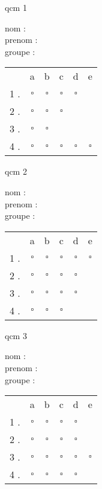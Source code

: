 \documentclass[a4paper]{article}
\begin{document}
	\begin{center}
		qcm 1
	\end{center}
	nom :\\
	prenom :\\
	groupe :
	\begin{center}
		\begin{tabular}{*{6}{c}}
			&a&b&c&d&e\\
			1 . &$\square$&$\square$&$\square$&$\square$\\
			2 . &$\square$&$\square$&$\square$\\
			3 . &$\square$&$\square$\\
			4 . &$\square$&$\square$&$\square$&$\square$&$\square$\\
		\end{tabular}
	\end{center}
	\newpage
	\begin{center}
		qcm 2
	\end{center}
	nom :\\
	prenom :\\
	groupe :
	\begin{center}
		\begin{tabular}{*{6}{c}}
			&a&b&c&d&e\\
			1 . &$\square$&$\square$&$\square$&$\square$&$\square$\\
			2 . &$\square$&$\square$&$\square$&$\square$\\
			3 . &$\square$&$\square$&$\square$&$\square$\\
			4 . &$\square$&$\square$&$\square$\\
		\end{tabular}
	\end{center}
	\newpage
	\begin{center}
		qcm 3
	\end{center}
	nom :\\
	prenom :\\
	groupe :
	\begin{center}
		\begin{tabular}{*{6}{c}}
			&a&b&c&d&e\\
			1 . &$\square$&$\square$&$\square$&$\square$\\
			2 . &$\square$&$\square$&$\square$&$\square$\\
			3 . &$\square$&$\square$&$\square$&$\square$&$\square$\\
			4 . &$\square$&$\square$&$\square$&$\square$\\
		\end{tabular}
	\end{center}
	\newpage
\end{document}
